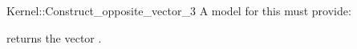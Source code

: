 \begin{ccRefFunctionObjectConcept}{Kernel::Construct_opposite_vector_3}
A model for this must provide:


{returns the vector .}

\end{ccRefFunctionObjectConcept}
